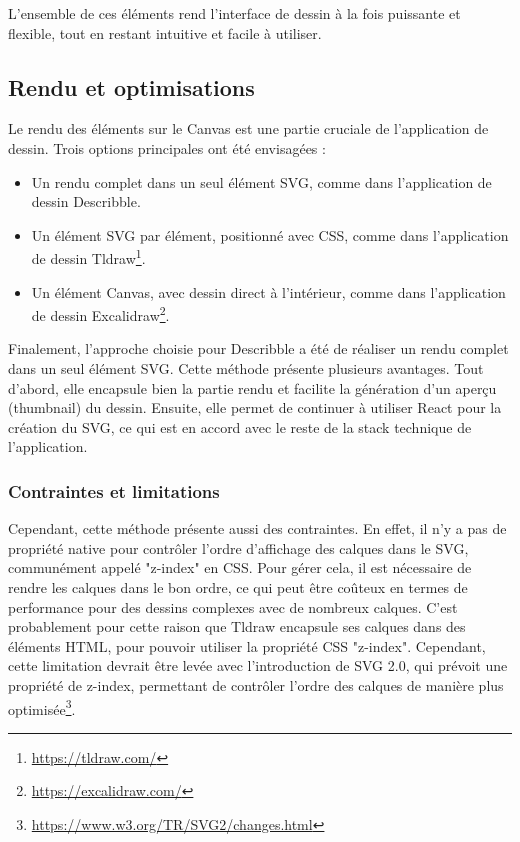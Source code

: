 L'ensemble de ces éléments rend l'interface de dessin à la fois puissante et flexible, tout en restant intuitive et facile à utiliser.

\subsection{Rendu et optimisations}

Le rendu des éléments sur le Canvas est une partie cruciale de l'application de dessin. Trois options principales ont été envisagées :

\begin{itemize}
    \item Un rendu complet dans un seul élément SVG, comme dans l'application de dessin \Gls{Describble}.
    \item Un élément SVG par élément, positionné avec CSS, comme dans l'application de dessin Tldraw\footnote{\url{https://tldraw.com/}}.
    \item Un élément Canvas, avec dessin direct à l'intérieur, comme dans l'application de dessin Excalidraw\footnote{\url{https://excalidraw.com/}}.
\end{itemize}

Finalement, l'approche choisie pour \Gls{Describble} a été de réaliser un rendu complet dans un seul élément SVG. Cette méthode présente plusieurs avantages. Tout d'abord, elle encapsule bien la partie rendu et facilite la génération d'un aperçu (thumbnail) du dessin. Ensuite, elle permet de continuer à utiliser React pour la création du SVG, ce qui est en accord avec le reste de la stack technique de l'application.

\subsubsection{Contraintes et limitations}

Cependant, cette méthode présente aussi des contraintes. En effet, il n'y a pas de propriété native pour contrôler l'ordre d'affichage des calques dans le SVG, communément appelé "z-index" en CSS. Pour gérer cela, il est nécessaire de rendre les calques dans le bon ordre, ce qui peut être coûteux en termes de performance pour des dessins complexes avec de nombreux calques. C'est probablement pour cette raison que Tldraw encapsule ses calques dans des éléments HTML, pour pouvoir utiliser la propriété CSS "z-index". Cependant, cette limitation devrait être levée avec l'introduction de SVG 2.0, qui prévoit une propriété de z-index, permettant de contrôler l'ordre des calques de manière plus optimisée\footnote{\url{https://www.w3.org/TR/SVG2/changes.html}}.

